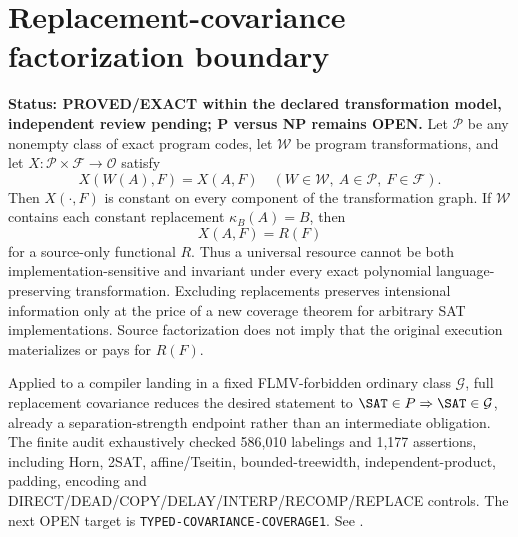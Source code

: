 \section{Replacement-covariance factorization boundary}
\textbf{Status: PROVED/EXACT within the declared transformation model, independent review pending; P versus NP remains OPEN.}
Let \(\mathcal P\) be any nonempty class of exact program codes, let
\(\mathcal W\) be program transformations, and let
\(X:\mathcal P\times\mathcal F\to\mathcal O\) satisfy
\[
 X(W(A),F)=X(A,F)
 \quad(W\in\mathcal W,\ A\in\mathcal P,\ F\in\mathcal F).
\]
Then \(X(\cdot,F)\) is constant on every component of the transformation
graph. If \(\mathcal W\) contains each constant replacement
\(\kappa_B(A)=B\), then
\[
 X(A,F)=R(F)
\]
for a source-only functional \(R\). Thus a universal resource cannot be both
implementation-sensitive and invariant under every exact polynomial
language-preserving transformation. Excluding replacements preserves
intensional information only at the price of a new coverage theorem for
arbitrary SAT implementations. Source factorization does not imply that the
original execution materializes or pays for \(R(F)\).

Applied to a compiler landing in a fixed FLMV-forbidden ordinary class
\(\mathcal G\), full replacement covariance reduces the desired statement to
\(\SAT\in P\Rightarrow\SAT\in\mathcal G\), already a
separation-strength endpoint rather than an intermediate obligation. The
finite audit exhaustively checked 586,010 labelings and 1,177 assertions,
including Horn, 2SAT, affine/Tseitin, bounded-treewidth, independent-product,
padding, encoding and DIRECT/DEAD/COPY/DELAY/INTERP/RECOMP/REPLACE controls.
The next OPEN target is \texttt{TYPED-COVARIANCE-COVERAGE1}.
See .

